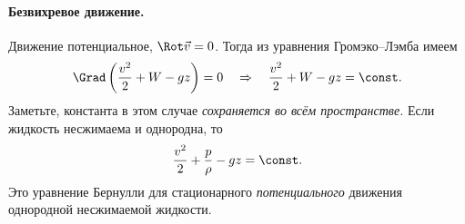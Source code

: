 \paragraph{Безвихревое движение.}
Движение потенциальное, $\Rot \vec{v}=0$. 		Тогда из уравнения Громэко--Лэмба имеем
\begin{equation}\begin{aligned}
\Grad \left( \frac { v^2 } { 2 } + W - g z \right) = 0 \quad \Rightarrow \quad
\frac { v^2 } { 2 } + W - g z = \const.
\end{aligned}\end{equation}
Заметьте, константа в этом случае \textit{сохраняется во всём пространстве.} Если жидкость несжимаема и однородна, то
\begin{equation}
\frac { v^2 } { 2 } + \frac { p } { \rho } - g z = \const.
\end{equation}
Это уравнение Бернулли для стационарного \textit{потенциального} движения однородной несжимаемой жидкости.

